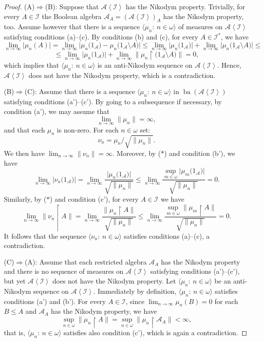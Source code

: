\documentclass[a4paper,11pt,fleqn]{amsart}
\theoremstyle{definition}
\theoremstyle{remark}
\numberwithin{equation}{section}
\newcommand{\N}{\mathbb{N}}
\newcommand{\aA}{\mathcal{A}}
\newcommand{\iI}{\mathcal{I}}
\DeclareMathOperator{\ba}{ba}
\newcommand{\rstr}{\restriction}
\newcommand{\sm}{\setminus}
\newcommand{\seqn}[1]{\big\langle#1\colon\ n\io\big\rangle}
\newcommand{\gen}[1]{\mathopen{}\left\langle#1\mathclose{}\right\rangle}
\newcommand{\io}{\in\omega}%
\begin{document}
\begin{proof}
(A)$\Rightarrow$(B): Suppose that $\aA\gen{\iI}$ has the Nikodym property. Trivially, for every $A\in\iI$ the Boolean algebra $\aA_A=(\aA\gen{\iI})_A$ has the Nikodym property, too. Assume however that there is a sequence $\seqn{\mu_n}$ of measures on $\aA\gen{\iI}$ satisfying conditions (a)--(c). By conditions (b) and (c), for every $A\in\iI^*$, we have
\[\lim_{n\to\infty}\big|\mu_n(A)\big|=\lim_{n\to\infty}\big|\mu_n\big(1_\aA\big)-\mu_n\big(1_\aA\sm A\big)\big|\le\lim_{n\to\infty}\big|\mu_n\big(1_\aA\big)\big|+\lim_{n\to\infty}\big|\mu_n\big(1_\aA\sm A\big)\big|\le\]
\[\le\lim_{n\to\infty}\big|\mu_n\big(1_\aA\big)\big|+\lim_{n\to\infty}\big\|\mu_n\rstr\big(1_\aA\sm A\big)\big\|=0,\]
which implies that $\seqn{\mu_n}$ is an anti-Nikodym sequence on $\aA\gen{\iI}$. Hence, $\aA\gen{\iI}$ does not have the Nikodym property, which is a contradiction.

\medskip

(B)$\Rightarrow$(C): Assume that there is a sequence $\seqn{\mu_n}$ in  $\ba(\aA\gen{\iI})$ satisfying conditions (a')--(c'). By going to a subsequence if necessary, by condition (a'), we may assume that
\[\tag{$*$}\lim_{n\to\infty}\big\|\mu_n\big\|=\infty,\]
and that each $\mu_n$ is non-zero. For each $n\io$ set:
\[\nu_n=\mu_n\big/\sqrt{\big\|\mu_n\big\|}.\]
We then have $\lim_{n\to\infty}\big\|\nu_n\big\|=\infty$. Moreover, by ($*$) and condition (b'), we have
\[\lim_{n\to\infty}\big|\nu_n\big(1_\aA\big)\big|=\lim_{n\to\infty}\frac{\big|\mu_n\big(1_\aA\big)\big|}{\sqrt{\big\|\mu_n\big\|}}\le\lim_{n\to\infty}\frac{\sup_{m\io}\big|\mu_m\big(1_\aA\big)\big|}{\sqrt{\big\|\mu_n\big\|}}=0.\]
Similarly, by ($*$) and condition (c'), for every $A\in\iI$ we have
\[\lim_{n\to\infty}\big\|\nu_n\rstr A\big\|=\lim_{n\to\infty}\frac{\big\|\mu_n\rstr A\big\|}{\sqrt{\big\|\mu_n\big\|}}\le\lim_{n\to\infty}\frac{\sup_{m\io}\big\|\mu_m\rstr A\big\|}{\sqrt{\big\|\mu_n\big\|}}=0.\]
It follows that the sequence $\seqn{\nu_n}$ satisfies conditions (a)--(c), a contradiction.

%

\medskip

(C)$\Rightarrow$(A): Assume that each restricted algebra $\aA_A$ has the Nikodym property and there is no sequence of measures on $\aA\gen{\iI}$ satisfying conditions (a')--(c'), but yet $\aA\gen{\iI}$ does not have the Nikodym property. Let $\seqn{\mu_n}$ be an anti-Nikodym sequence on $\aA\gen{\iI}$. Immediately by definition, $\seqn{\mu_n}$ satisfies conditions (a') and (b'). %
For every $A\in\iI$, since $\lim_{n\to\infty}\mu_n(B)=0$ for each $B\le A$ and $\aA_A$ has the Nikodym property, we have
\[\sup_{n\io}\big\|\mu_n\rstr A\big\|=\sup_{n\io}\big\|\mu_n\rstr\aA_A\big\|<\infty,\]
that is, $\seqn{\mu_n}$ satisfies also condition (c'), which is again a contradiction.
\end{proof}
\end{document}
